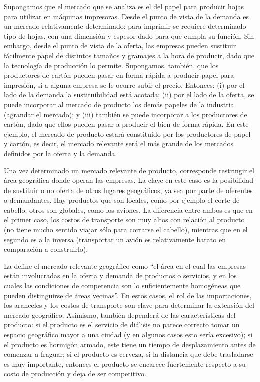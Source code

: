 \documentclass[
  12pt,
  spanish,
]{book}
\begin{document}
Supongamos que el mercado que se analiza es el del papel para producir hojas para utilizar en máquinas impresoras. Desde el punto de vista de la demanda es un mercado relativamente determinado: para imprimir se requiere determinado tipo de hojas, con una dimensión y espesor dado para que cumpla su función. Sin embargo, desde el punto de vista de la oferta, las empresas pueden sustituir fácilmente papel de distintos tamaños y gramajes a la hora de producir, dado que la tecnología de producción lo permite. Supongamos, también, que los productores de cartón pueden pasar en forma rápida a producir papel para impresión, si a alguna empresa se le ocurre subir el precio. Entonces: (i) por el lado de la demanda la sustituibilidad está acotada; (ii) por el lado de la oferta, se puede incorporar al mercado de producto los demás papeles de la industria (agrandar el mercado); y (iii) también se puede incorporar a los productores de cartón, dado que ellos pueden pasar a producir el bien de forma rápida. En este ejemplo, el mercado de producto estará constituido por los productores de papel y cartón, es decir, el mercado relevante será el más grande de los mercados definidos por la oferta y la demanda.

Una vez determinado un mercado relevante de producto, corresponde restringir el área geográfica donde operan las empresas. La clave en este caso es la posibilidad de sustituir o no oferta de otros lugares geográficos, ya sea por parte de oferentes o demandantes. Hay productos que son locales, como por ejemplo el corte de cabello; otros son globales, como los aviones. La diferencia entre ambos es que en el primer caso, los costos de transporte son muy altos con relación al producto (no tiene mucho sentido viajar sólo para cortarse el cabello), mientras que en el segundo es a la inversa (transportar un avión es relativamente barato en comparación a construirlo).

La \citet{UE1997} define el mercado relevante geográfico como ``el área en el cual las empresas están involucradas en la oferta y demanda de productos o servicios, y en los cuales las condiciones de competencia son lo suficientemente homogéneas que pueden distinguirse de áreas vecinas''. En estos casos, el rol de las importaciones, los aranceles y los costos de transporte son clave para determinar la extensión del mercado geográfico. Asimismo, también dependerá de las características del producto: si el producto es el servicio de diálisis no parece correcto tomar un espacio geográfico mayor a una ciudad (y en algunos casos esto sería excesivo); si el producto es hormigón armado, este tiene un tiempo de desplazamiento antes de comenzar a fraguar; si el producto es cerveza, si la distancia que debe trasladarse es muy importante, entonces el producto se encarece fuertemente respecto a su costo de producción y deja de ser competitivo.
\end{document}
